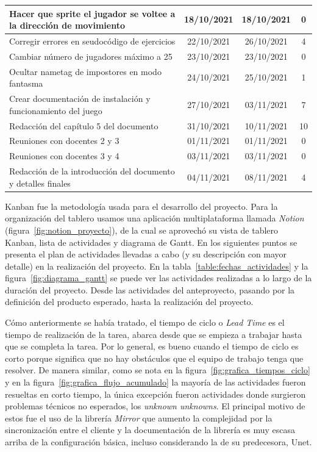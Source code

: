 \begin{longtable}[c]{|m{5cm}|c|c|c|}
        Hacer que sprite el jugador se voltee a la dirección de movimiento & 18/10/2021 & 18/10/2021 & 0 \\ \hline
        Corregir errores en seudocódigo de ejercicios & 22/10/2021 & 26/10/2021 & 4 \\ \hline
        Cambiar número de jugadores máximo a 25 & 23/10/2021 & 23/10/2021 & 0 \\ \hline
        Ocultar nametag de impostores en modo fantasma & 24/10/2021 & 25/10/2021 & 1 \\ \hline
        Crear documentación de instalación y funcionamiento del juego & 27/10/2021 & 03/11/2021 & 7 \\ \hline
        Redacción del capítulo 5 del documento & 31/10/2021 & 10/11/2021 & 10 \\ \hline
        Reuniones con docentes 2 y 3 & 01/11/2021 & 01/11/2021 & 0 \\ \hline
        Reuniones con docentes 3 y 4 & 03/11/2021 & 03/11/2021 & 0 \\ \hline
        Redacción de la introducción del documento y detalles finales & 04/11/2021 & 08/11/2021 & 4 \\ \hline
\end{longtable}

Kanban fue la metodología usada para el desarrollo del proyecto. Para la organización del tablero usamos una aplicación multiplataforma llamada  \textit{Notion} (figura~\ref{fig:notion_proyecto}), de la cual se aprovechó su vista de tablero Kanban, lista de actividades y diagrama de Gantt. En los siguientes puntos se presenta el plan de actividades llevadas a cabo (y su descripción con mayor detalle) en la realización del proyecto. En la tabla~\ref{table:fechas_actividades} y la figura~\ref{fig:diagrama_gantt} se puede ver las actividades realizadas a lo largo de la duración del proyecto. Desde las actividades del anteproyecto, pasando por la definición del producto esperado, hasta la realización del proyecto. 

Cómo anteriormente se había tratado, el tiempo de ciclo o \textit{Lead Time} es el tiempo de realización de la tarea, abarca desde que se empieza a trabajar hasta que se completa la tarea. Por lo general, es bueno cuando el tiempo de ciclo es corto porque significa que no hay obstáculos que el equipo de trabajo tenga que resolver. De manera similar, como se nota en la figura~\ref{fig:grafica_tiempos_ciclo} y en la figura~\ref{fig:grafica_flujo_acumulado} la mayoría de las actividades fueron resueltas en corto tiempo, la única excepción fueron actividades donde surgieron problemas técnicos no esperados, los \textit{unknown unknowns}. El principal motivo de estos fue el uso de la librería \textit{Mirror} que aumento la complejidad por la sincronización entre el cliente y la documentación de la librería es muy escasa arriba de la configuración básica, incluso considerando la de su predecesora, Unet.

